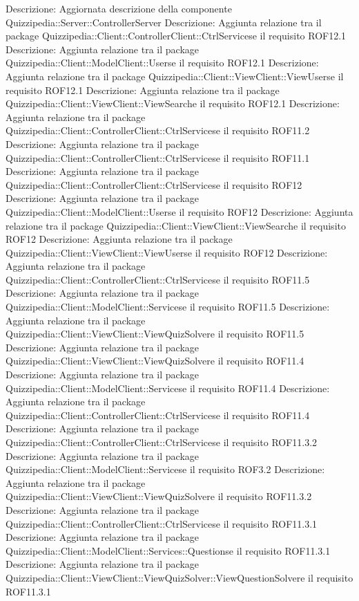 Descrizione: Aggiornata descrizione della componente Quizzipedia::Server::ControllerServer 
Descrizione: Aggiunta relazione tra il package Quizzipedia::Client::ControllerClient::CtrlServicese il requisito ROF12.1 
Descrizione: Aggiunta relazione tra il package Quizzipedia::Client::ModelClient::Userse il requisito ROF12.1 
Descrizione: Aggiunta relazione tra il package Quizzipedia::Client::ViewClient::ViewUserse il requisito ROF12.1 
Descrizione: Aggiunta relazione tra il package Quizzipedia::Client::ViewClient::ViewSearche il requisito ROF12.1 
Descrizione: Aggiunta relazione tra il package Quizzipedia::Client::ControllerClient::CtrlServicese il requisito ROF11.2 
Descrizione: Aggiunta relazione tra il package Quizzipedia::Client::ControllerClient::CtrlServicese il requisito ROF11.1 
Descrizione: Aggiunta relazione tra il package Quizzipedia::Client::ControllerClient::CtrlServicese il requisito ROF12 
Descrizione: Aggiunta relazione tra il package Quizzipedia::Client::ModelClient::Userse il requisito ROF12 
Descrizione: Aggiunta relazione tra il package Quizzipedia::Client::ViewClient::ViewSearche il requisito ROF12 
Descrizione: Aggiunta relazione tra il package Quizzipedia::Client::ViewClient::ViewUserse il requisito ROF12 
Descrizione: Aggiunta relazione tra il package Quizzipedia::Client::ControllerClient::CtrlServicese il requisito ROF11.5 
Descrizione: Aggiunta relazione tra il package Quizzipedia::Client::ModelClient::Servicese il requisito ROF11.5 
Descrizione: Aggiunta relazione tra il package Quizzipedia::Client::ViewClient::ViewQuizSolvere il requisito ROF11.5 
Descrizione: Aggiunta relazione tra il package Quizzipedia::Client::ViewClient::ViewQuizSolvere il requisito ROF11.4 
Descrizione: Aggiunta relazione tra il package Quizzipedia::Client::ModelClient::Servicese il requisito ROF11.4 
Descrizione: Aggiunta relazione tra il package Quizzipedia::Client::ControllerClient::CtrlServicese il requisito ROF11.4 
Descrizione: Aggiunta relazione tra il package Quizzipedia::Client::ControllerClient::CtrlServicese il requisito ROF11.3.2 
Descrizione: Aggiunta relazione tra il package Quizzipedia::Client::ModelClient::Servicese il requisito ROF3.2 
Descrizione: Aggiunta relazione tra il package Quizzipedia::Client::ViewClient::ViewQuizSolvere il requisito ROF11.3.2 
Descrizione: Aggiunta relazione tra il package Quizzipedia::Client::ControllerClient::CtrlServicese il requisito ROF11.3.1 
Descrizione: Aggiunta relazione tra il package Quizzipedia::Client::ModelClient::Services::Questionse il requisito ROF11.3.1 
Descrizione: Aggiunta relazione tra il package Quizzipedia::Client::ViewClient::ViewQuizSolver::ViewQuestionSolvere il requisito ROF11.3.1 

